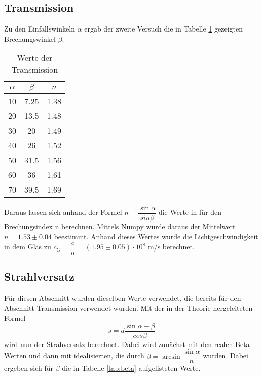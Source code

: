 \subsection{Transmission}
  Zu den Einfallswinkeln $\alpha$ ergab der zweite Versuch die in Tabelle \ref{tab:trans} gezeigten 
  Brechungswinkel $\beta$.
  \begin{table}[H]
    \centering
    \caption{Werte der Transmission}
    \begin{tabular}{c c c}
      \toprule
      $\alpha$ & $\beta$&$n$\\
      \midrule
        10 & 7.25& 1.38 \\
        20 & 13.5& 1.48 \\
        30 & 20  & 1.49 \\
        40 & 26  & 1.52 \\
        50 & 31.5& 1.56 \\
        60 & 36  & 1.61  \\
        70 & 39.5& 1.69 \\
      \bottomrule
    \end{tabular}
    \label{tab:trans}
  \end{table}
  \noindent Daraus lassen sich anhand der Formel $n = \dfrac{\sin{\alpha}}{sin{\beta}}$ die
  Werte in für den Brechungsindex n berechnen.
  \noindent Mittels Numpy wurde daraus der Mittelwert $n=1.53\pm 0.04$ beestimmt. Anhand 
  dieses Wertes wurde die Lichtgeschwindigkeit in dem Glas zu $c_G=\dfrac{c}{n}= (1.95\pm 0.05)
  \cdot 10^{8}$ m/s berechnet.

\subsection{Strahlversatz}
  Für diesen Abschnitt wurden dieselben Werte verwendet, die bereits für den Abschnitt 
  Transmission verwendet wurden.
  Mit der in der Theorie hergeleiteten Formel 
  \begin{equation*}
    s= d\dfrac{\sin{\alpha - \beta}}{cos{\beta}} 
  \end{equation*}
  wird nun der Strahversatz berechnet. Dabei wird zunächst mit den realen Beta-Werten und dann
  mit idealisierten, die durch $\beta=\arcsin{\dfrac{\sin{\alpha}}{n}}$ wurden. Dabei ergeben 
  sich für $\beta$ die in Tabelle \ref{tab:beta} aufgelisteten Werte.


